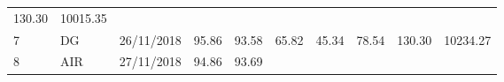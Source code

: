 \documentclass[
  11pt,
]{article}
\begin{document}
\begin{longtable}[]{@{}llllllllll@{}}
\begin{minipage}[t]{0.13\columnwidth}
130.30\strut
\end{minipage} & \begin{minipage}[t]{0.08\columnwidth}\raggedright
10015.35\strut
\end{minipage}\tabularnewline
\begin{minipage}[t]{0.04\columnwidth}\raggedright
7\strut
\end{minipage} & \begin{minipage}[t]{0.09\columnwidth}\raggedright
DG\strut
\end{minipage} & \begin{minipage}[t]{0.10\columnwidth}\raggedright
26/11/2018\strut
\end{minipage} & \begin{minipage}[t]{0.06\columnwidth}\raggedright
95.86\strut
\end{minipage} & \begin{minipage}[t]{0.06\columnwidth}\raggedright
93.58\strut
\end{minipage} & \begin{minipage}[t]{0.06\columnwidth}\raggedright
65.82\strut
\end{minipage} & \begin{minipage}[t]{0.06\columnwidth}\raggedright
45.34\strut
\end{minipage} & \begin{minipage}[t]{0.06\columnwidth}\raggedright
78.54\strut
\end{minipage} & \begin{minipage}[t]{0.13\columnwidth}\raggedright
130.30\strut
\end{minipage} & \begin{minipage}[t]{0.08\columnwidth}\raggedright
10234.27\strut
\end{minipage}\tabularnewline
\begin{minipage}[t]{0.04\columnwidth}\raggedright
8\strut
\end{minipage} & \begin{minipage}[t]{0.09\columnwidth}\raggedright
AIR\strut
\end{minipage} & \begin{minipage}[t]{0.10\columnwidth}\raggedright
27/11/2018\strut
\end{minipage} & \begin{minipage}[t]{0.06\columnwidth}\raggedright
94.86\strut
\end{minipage} & \begin{minipage}[t]{0.06\columnwidth}\raggedright
93.69\strut
\end{minipage} & \begin{minipage}[t]{0.06\columnwidth}\raggedright

\end{minipage}
\end{longtable}
\end{document}
